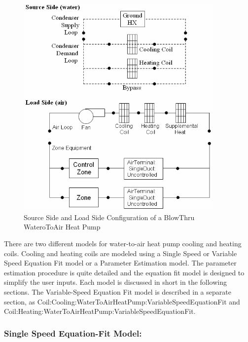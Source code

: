 \begin{figure}[hbtp] %
\centering
\includegraphics[width=0.9\textwidth, height=0.9\textheight, keepaspectratio=true]{media/image5222.png}
\caption{Source Side and Load Side Configuration of a BlowThru WateroToAir Heat Pump \protect \label{fig:source-side-and-load-side-configuration-of-a}}
\end{figure}

There are two different models for water-to-air heat pump cooling and heating coils. Cooling and heating coils are modeled using a Single Speed or Variable Speed Equation Fit model or a Parameter Estimation model. The parameter estimation procedure is quite detailed and the equation fit model is designed to simplify the user inputs. Each model is discussed in short in the following sections. The Variable-Speed Equation Fit model is described in a separate section, as Coil:Cooling:WaterToAirHeatPump:VariableSpeedEquationFit and Coil:Heating:WaterToAirHeatPump:VariableSpeedEquationFit.

\subsubsection{Single Speed Equation-Fit Model:}\label{single-speed-equation-fit-model}

